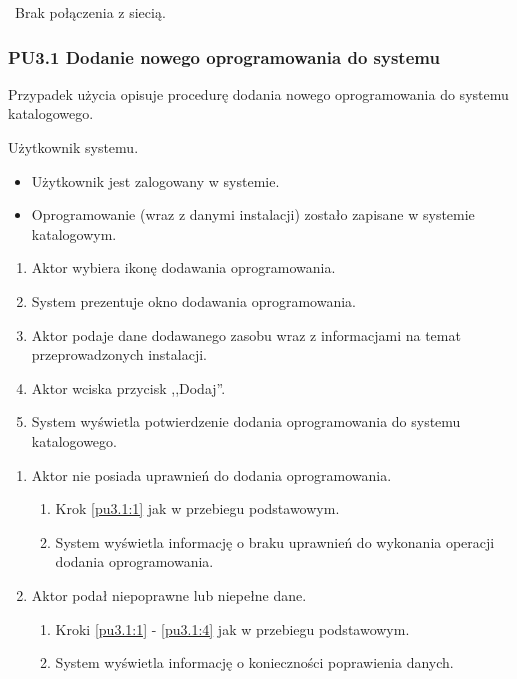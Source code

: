 \
Brak połączenia z siecią.

\subsubsection{PU3.1 Dodanie nowego oprogramowania do systemu}

Przypadek użycia opisuje procedurę dodania nowego oprogramowania do systemu katalogowego.

Użytkownik systemu.

\begin{itemize}
\item Użytkownik jest zalogowany w systemie.
\end{itemize}

\begin{itemize}
\item Oprogramowanie (wraz z danymi instalacji) zostało zapisane w systemie katalogowym.
\end{itemize}

\begin{enumerate}
\item \label{pu3.1:1} Aktor wybiera ikonę dodawania oprogramowania.
\item System prezentuje okno dodawania oprogramowania.
\item Aktor podaje dane dodawanego zasobu wraz z informacjami na temat przeprowadzonych instalacji.
\item \label{pu3.1:4} Aktor wciska przycisk ,,Dodaj''.
\item System wyświetla potwierdzenie dodania oprogramowania do systemu katalogowego.
\end{enumerate}

\begin{enumerate}
\item Aktor nie posiada uprawnień do dodania oprogramowania.
	\begin{enumerate}[label*=\arabic*.]
		\item Krok \ref{pu3.1:1} jak w przebiegu podstawowym.
		\item System wyświetla informację o braku uprawnień do wykonania operacji dodania oprogramowania.
	\end{enumerate}
\item Aktor podał niepoprawne lub niepełne dane.
	\begin{enumerate}[label*=\arabic*.]
		\item Kroki \ref{pu3.1:1} - \ref{pu3.1:4} jak w przebiegu podstawowym.
		\item System wyświetla informację o konieczności poprawienia danych.
	\end{enumerate}
\end{enumerate}

